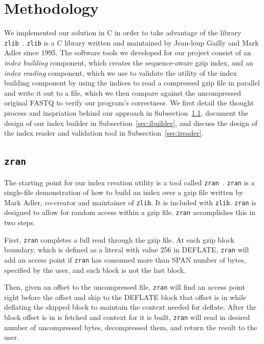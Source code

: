 \documentclass[unnumsec,webpdf,contemporary,large]{oup-authoring-template}
\newcommand{\zlib}{\texttt{zlib}\xspace}
\newcommand{\zran}{\texttt{zran}\xspace}
\newcommand{\gzip}{gzip\xspace}
\begin{document}


\section{Methodology}
We implemented our solution in C in order to take advantage of the library
\zlib~\cite{zlib}. \zlib is a C library written and maintained by Jean-loup
Gailly and Mark Adler since 1995.
The software tools we developed for our project consist of an \emph{index
building} component, which creates the sequence-aware \gzip index, and an
\emph{index reading} component, which we use to validate the utility of the
index building component by using the indices to read a compressed gzip file in
parallel and write it out to a file, which we then compare against the
uncompressed original FASTQ to verify our program's correctness. We first detail
the thought process and inspriation behind our approach in
Subsection~\ref{sec:zran}, document the design of our index builder in
Subsection~\ref{sec:ibuilder}, and discuss the design of the index reader and validation
tool in Subsection~\ref{sec:ireader}.

\subsection{\zran}
\label{sec:zran}

The starting point for our index creation utility is a tool called
\zran~\cite{zran}. \zran
is a single-file demonstration of how to build an index over a \gzip file
written by Mark Adler, co-creator and maintainer of \zlib. It is included with
\zlib. \zran is designed to allow for random access within a \gzip file. \zran
accomplishes this in two steps. 

First, \zran completes a full read through the \gzip file. At each \gzip block boundary, which is defined as a literal with value 256 in DEFLATE, \zran will add an access point if \zran has consumed more than SPAN number of bytes, specified by the user, and such block is not the last block. 

Then, given an offset to the uncompressed file, \zran will find an access point right before the offset and skip to the DEFLATE block that offset is in while deflating the skipped block to maintain the context needed for deflate. After the block offset is in is fetched and context for it is built, \zran will read in desired number of uncompressed bytes, decompressed them, and return the result to the user. 
\end{document}
